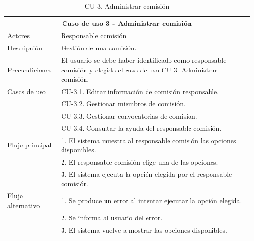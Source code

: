 \begin{table}[H]
        \caption{CU-3. Administrar comisión}
        \label{tab:CU-3}
        \begin{center}
            \begin{tabular}{|l|p{12cm}|}
                \hline
                \multicolumn{2}{|c|}{Caso de uso 3 - Administrar comisión} \\ \hline \hline
                Actores                 &   Responsable  comisión         \\  \hline
                Descripción             &   Gestión de una comisión. \\  \hline
                Precondiciones          &   El usuario se debe haber identificado como responsable comisión y elegido el caso de uso CU-3. Administrar comisión.  \\  \hline
                Casos de uso            &  CU-3.1. Editar información de comisión responsable. \\ 
                &
                CU-3.2. Gestionar miembros de comisión. \\ 
                &
                CU-3.3. Gestionar convocatorias de comisión. \\ 
                & 
                CU-3.4. Consultar la ayuda del responsable comisión. \\ 
                \hline
                Flujo principal     &    1. El sistema muestra al responsable comisión las opciones disponibles.\\ 
                &   2. El responsable comisión elige una de las opciones.\\ 
                &   3. El sistema ejecuta la opción elegida por el responsable comisión.\\ 
                \hline
                Flujo alternativo    &  1. Se produce un error al intentar ejecutar la opción elegida. \\ 
                &  2. Se informa al usuario del error.  \\  
                &  3. El sistema vuelve a mostrar las opciones disponibles.  \\
                \hline
            \end{tabular}
        \end{center}
    \end{table}


